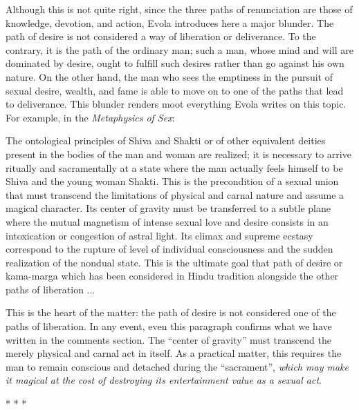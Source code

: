Although this is not quite right, since the three paths of renunciation are those of knowledge, devotion, and action, Evola introduces here a major blunder. The path of desire is not considered a way of liberation or deliverance. To the contrary, it is the path of the ordinary man; such a man, whose mind and will are dominated by desire, ought to fulfill such desires rather than go against his own nature. On the other hand, the man who sees the emptiness in the pursuit of sexual desire, wealth, and fame is able to move on to one of the paths that lead to deliverance. This blunder renders moot everything Evola writes on this topic. For example, in the \emph{Metaphysics of Sex}:

\begin{quotex}
The ontological principles of Shiva and Shakti or of other equivalent deities present in the bodies of the man and woman are realized; it is necessary to arrive ritually and sacramentally at a state where the man actually feels himself to be Shiva and the young woman Shakti. This is the precondition of a sexual union that must transcend the limitations of physical and carnal nature and assume a magical character. Its center of gravity must be transferred to a subtle plane where the mutual magnetism of intense sexual love and desire consists in an intoxication or congestion of astral light. Its climax and supreme ecstasy correspond to the rupture of level of individual consciousness and the sudden realization of the nondual state. This is the ultimate goal that path of desire or kama-marga which has been considered in Hindu tradition alongside the other paths of liberation ... 
\end{quotex}


This is the heart of the matter: the path of desire is not considered one of the paths of liberation. In any event, even this paragraph confirms what we have written in the comments section. The ``center of gravity'' must transcend the merely physical and carnal act in itself. As a practical matter, this requires the man to remain conscious and detached during the ``sacrament'', \emph{which may make it magical at the cost of destroying its entertainment value as a sexual act}.



\begin{center}* * *\end{center}

